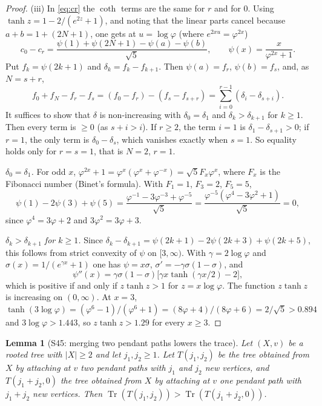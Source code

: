 \documentclass[11pt]{amsart}
\newtheorem{lemma}[theorem]{Lemma}
\theoremstyle{definition}
\theoremstyle{remark}
\newcommand{\Tr}{\operatorname{Tr}}
\begin{document}
\begin{proof}
(iii) In \eqref{eq:cr} the $\coth$ terms are the same for $r$ and for $0$.
Using $\tanh z=1-2/(e^{2z}+1)$, and noting that the linear parts cancel
because $a+b=1+(2N+1)$, one gets at $u=\log\varphi$ (where
$e^{2xu}=\varphi^{2x}$)
\[
c_0-c_r=\frac{\psi(1)+\psi(2N+1)-\psi(a)-\psi(b)}{\sqrt5},\qquad
\psi(x)=\frac{x}{\varphi^{2x}+1}.
\]
Put $f_k=\psi(2k+1)$ and $\delta_k=f_k-f_{k+1}$. Then $\psi(a)=f_r$,
$\psi(b)=f_s$, and, as $N=s+r$,
\[
f_0+f_N-f_r-f_s=(f_0-f_r)-(f_s-f_{s+r})=\sum_{i=0}^{r-1}(\delta_i-\delta_{s+i}).
\]
It suffices to show that $\delta$ is non-increasing with $\delta_0=\delta_1$
and $\delta_k>\delta_{k+1}$ for $k\ge1$. Then every term is $\ge0$ (as
$s+i>i$). If $r\ge2$, the term $i=1$ is $\delta_1-\delta_{s+1}>0$; if $r=1$,
the only term is $\delta_0-\delta_s$, which vanishes exactly when $s=1$. So
equality holds only for $r=s=1$, that is $N=2$, $r=1$.

\emph{$\delta_0=\delta_1$.} For odd $x$,
$\varphi^{2x}+1=\varphi^x(\varphi^x+\varphi^{-x})=\sqrt5F_x\varphi^x$, where
$F_x$ is the Fibonacci number (Binet's formula). With $F_1=1$, $F_3=2$,
$F_5=5$,
\[
\psi(1)-2\psi(3)+\psi(5)=\frac{\varphi^{-1}-3\varphi^{-3}+\varphi^{-5}}{\sqrt5}
=\frac{\varphi^{-5}(\varphi^4-3\varphi^2+1)}{\sqrt5}=0,
\]
since $\varphi^4=3\varphi+2$ and $3\varphi^2=3\varphi+3$.

\emph{$\delta_k>\delta_{k+1}$ for $k\ge1$.} Since
$\delta_k-\delta_{k+1}=\psi(2k+1)-2\psi(2k+3)+\psi(2k+5)$, this follows from
strict convexity of $\psi$ on $[3,\infty)$. With $\gamma=2\log\varphi$ and
$\sigma(x)=1/(e^{\gamma x}+1)$ one has $\psi=x\sigma$,
$\sigma'=-\gamma\sigma(1-\sigma)$, and
\[
\psi''(x)=\gamma\sigma(1-\sigma)\bigl[\gamma x\tanh(\gamma x/2)-2\bigr],
\]
which is positive if and only if $z\tanh z>1$ for $z=x\log\varphi$. The
function $z\tanh z$ is increasing on $(0,\infty)$. At $x=3$,
$\tanh(3\log\varphi)=(\varphi^6-1)/(\varphi^6+1)=(8\varphi+4)/(8\varphi+6)=2/\sqrt5>0.894$
and $3\log\varphi>1.443$, so $z\tanh z>1.29$ for every $x\ge3$.
\end{proof}

\begin{lemma}[S45: merging two pendant paths lowers the trace]\label{lem:S45}
Let $(X,v)$ be a rooted tree with $|X|\ge2$ and let $j_1,j_2\ge1$. Let
$T(j_1,j_2)$ be the tree obtained from $X$ by attaching at $v$ two pendant
paths with $j_1$ and $j_2$ new vertices, and $T(j_1+j_2,0)$ the tree
obtained from $X$ by attaching at $v$ one pendant path with $j_1+j_2$ new
vertices. Then $\Tr(T(j_1,j_2))>\Tr(T(j_1+j_2,0))$.
\end{lemma}
\end{document}
